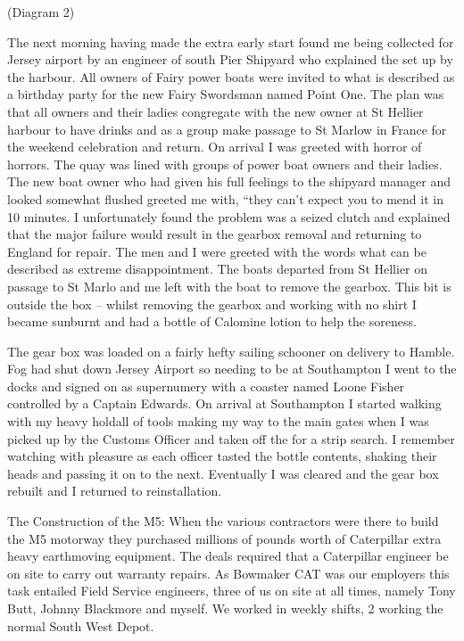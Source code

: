 (Diagram 2)

The next morning having made the extra early start found me being collected for
Jersey airport by an engineer of south Pier Shipyard who explained the set up
by the harbour.  All owners of Fairy power boats were invited to what is
described as a birthday party for the new Fairy Swordsman named Point One.  The
plan was that all owners and their ladies congregate with the new owner at St
Hellier harbour to have drinks and as a group make passage to St Marlow in
France for the weekend celebration and return.  On arrival I was greeted with
horror of horrors.  The quay was lined with groups of power boat owners and
their ladies.  The new boat owner who had given his full feelings to the
shipyard manager and looked somewhat flushed greeted me with, ``they can't
expect you to mend it in 10 minutes.  I unfortunately found the problem was a
seized clutch and explained that the major failure would result in the gearbox
removal and returning to England for repair.  The men and I were greeted with
the words what can be described as extreme disappointment.  The boats departed
from St Hellier on passage to St Marlo and me left with the boat to remove the
gearbox.  This bit is outside the box – whilst removing the gearbox and working
with no shirt I became sunburnt and had a bottle of Calomine lotion to help the
soreness.

The gear box was loaded on a fairly hefty sailing schooner on delivery to
Hamble.  Fog had shut down Jersey Airport so needing to be at Southampton I
went to the docks and signed on as supernumery with a coaster named Loone
Fisher controlled by a Captain Edwards.  On arrival at Southampton I started
walking with my heavy holdall of tools making my way to the main gates when I
was picked up by the Customs Officer and taken off  the for a strip search.  I
remember watching with pleasure as each officer tasted the bottle contents,
shaking their heads and passing it on to the next.  Eventually I was cleared
and the gear box rebuilt and I returned to reinstallation.

The Construction of the M5:  When the various contractors were there to build
the M5 motorway  they purchased millions of pounds worth of Caterpillar extra
heavy earthmoving equipment.  The deals required that a Caterpillar engineer be
on site to carry out warranty repairs.  As Bowmaker  CAT was our employers this
task entailed Field Service engineers, three of us on site at all times, namely
Tony Butt, Johnny Blackmore and myself.  We worked in weekly shifts, 2 working
the normal South West Depot.

